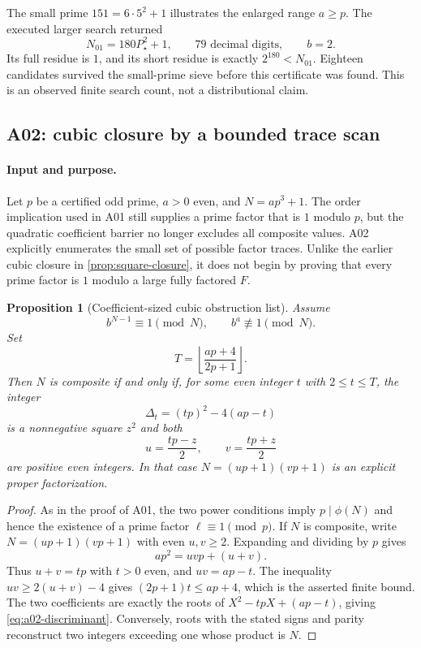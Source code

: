 \documentclass[11pt,a4paper]{article}
\newtheorem{proposition}[theorem]{Proposition}
\theoremstyle{definition}\newtheorem{definition}[theorem]{Definition}
\theoremstyle{remark}\newtheorem{remark}[theorem]{Remark}
\begin{document}
The small prime $151=6\cdot5^2+1$ illustrates the enlarged range $a\ge p$.
The executed larger search returned
\begin{equation}\label{eq:a01-example}
 N_{01}=180P_\star^2+1,
 \qquad \text{79 decimal digits},\qquad b=2.
\end{equation}
Its full residue is $1$, and its short residue is exactly $2^{180}<N_{01}$.
Eighteen candidates survived the small-prime sieve before this certificate
was found. This is an observed finite search count, not a distributional
claim.

\subsection{A02: cubic closure by a bounded trace scan}
\label{sec:a02}

\paragraph{Input and purpose.}
Let $p$ be a certified odd prime, $a>0$ even, and $N=ap^3+1$.
The order implication used in A01 still supplies a prime factor that is
$1$ modulo $p$, but the quadratic coefficient barrier no longer excludes
all composite values. A02 explicitly enumerates the small set of possible
factor traces. Unlike the earlier cubic closure in
\cref{prop:square-closure}, it does not begin by proving that every prime
factor is $1$ modulo a large fully factored $F$.

\begin{proposition}[Coefficient-sized cubic obstruction list]
\label{prop:a02}
Assume
\[
 b^{N-1}\equiv1\pmod N,
 \qquad b^a\not\equiv1\pmod N.
\]
Set
\[
 T=\left\lfloor\frac{ap+4}{2p+1}\right\rfloor.
\]
Then $N$ is composite if and only if, for some even integer $t$ with
$2\le t\le T$, the integer
\begin{equation}\label{eq:a02-discriminant}
 \Delta_t=(tp)^2-4(ap-t)
\end{equation}
is a nonnegative square $z^2$ and both
\[
 u=\frac{tp-z}{2},\qquad v=\frac{tp+z}{2}
\]
are positive even integers. In that case
$N=(up+1)(vp+1)$ is an explicit proper factorization.
\end{proposition}
\begin{proof}
As in the proof of A01, the two power conditions imply $p\mid\phi(N)$
and hence the existence of a prime factor $\ell\equiv1\pmod p$.
If $N$ is composite, write $N=(up+1)(vp+1)$ with even $u,v\ge2$.
Expanding and dividing by $p$ gives
\[
 ap^2=uvp+(u+v).
\]
Thus $u+v=tp$ with $t>0$ even, and $uv=ap-t$.
The inequality $uv\ge2(u+v)-4$ gives
$(2p+1)t\le ap+4$, which is the asserted finite bound.
The two coefficients are exactly the roots of
$X^2-tpX+(ap-t)$, giving \eqref{eq:a02-discriminant}.
Conversely, roots with the stated signs and parity reconstruct two
integers exceeding one whose product is $N$.
\end{proof}
\end{document}
